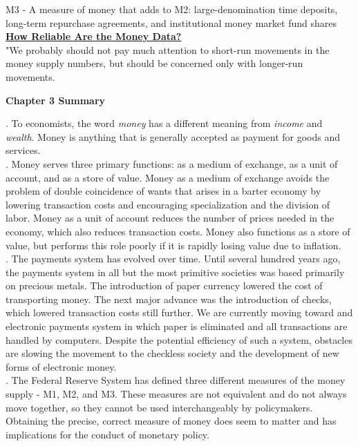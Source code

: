 \documentclass[12pt]{article}
\begin{document}
\noindent M3 - A measure of money that adds to M2: large-denomination time deposits, long-term repurchase agreements, and institutional money market fund shares\\

\noindent \underline{\bf How Reliable Are the Money Data?}\\

\noindent "We probably should not pay much attention to short-run movements in the money supply numbers, but should be concerned only with longer-run movements. \\

\newpage
\begin{center}
\large {\bf Chapter 3 Summary}
\end{center}

. To economists, the word \textit{money} has a different meaning from \textit{income} and \textit{wealth}. Money is anything that is generally accepted as payment for goods and services.\\

. Money serves three primary functions: as a medium of exchange, as a unit of account, and as a store of value. Money as a medium of exchange avoids the problem of double coincidence of wants that arises in a barter economy by lowering transaction costs and encouraging specialization and the division of labor. Money as a unit of account reduces the number of prices needed in the economy, which also reduces transaction costs. Money also functions as a store of value, but performs this role poorly if it is rapidly losing value due to inflation.\\

. The payments system has evolved over time. Until several hundred years ago, the payments system in all but the most primitive societies was based primarily on precious metals. The introduction of paper currency lowered the cost of transporting money. The next major advance was the introduction of checks, which lowered transaction costs still further. We are currently moving toward and electronic payments system in which paper is eliminated and all transactions are handled by computers. Despite the potential efficiency of such a system, obstacles are slowing the movement to the checkless society and the development of new forms of electronic money. \\

. The Federal Reserve System has defined three different measures of the money supply - M1, M2, and M3. These measures are not equivalent and do not always move together, so they cannot be used interchangeably by policymakers. Obtaining the precise, correct measure of money does seem to matter and has implications for the conduct of monetary policy.  \\
\end{document}
